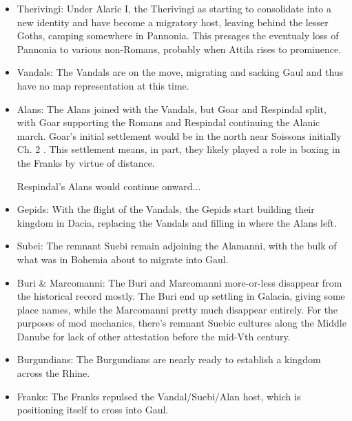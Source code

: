 \documentclass{article}
\newcommand{\specificCite}[1]{\tiny #1 \normalsize}
\begin{document}
\begin{itemize}
		\item Therivingi:\newline
		Under Alaric I, the Therivingi as starting to consolidate into a new identity and have become a migratory host, leaving behind the lesser Goths, camping somewhere in Pannonia.
		This presages the eventualy loss of Pannonia to various non-Romans, probably when Attila rises to prominence.
		
		\item Vandals:\newline
		The Vandals are on the move, migrating and sacking Gaul and thus have no map representation at this time.
		
		\item Alans:\newline
		The Alans joined with the Vandals, but Goar and Respindal split, with Goar supporting the Romans and Respindal continuing the Alanic march.
		Goar's initial settlement would be in the north near Soissons initially \cite{BachrachAlans}\specificCite{Ch. 2}.
		This settlement means, in part, they likely played a role in boxing in the Franks by virtue of distance.
		
		Respindal's Alans would continue onward...
		
		\item Gepids:\newline
		With the flight of the Vandals, the Gepids start building their kingdom in Dacia, replacing the Vandals and filling in where the Alans left.
		
		\item Subei:\newline
		The remnant Suebi remain adjoining the Alamanni, with the bulk of what was in Bohemia about to migrate into Gaul.
		
		\item Buri \& Marcomanni:\newline
		The Buri and Marcomanni more-or-less disappear from the historical record mostly.
		The Buri end up settling in Galacia, giving some place names, while the Marcomanni pretty much disappear entirely.
		For the purposes of mod mechanics, there's remnant Suebic cultures along the Middle Danube for lack of other attestation before the mid-Vth century.
		
		\item Burgundians:\newline
		The Burgundians are nearly ready to establish a kingdom across the Rhine.
		
		\item Franks:\newline
		The Franks repulsed the Vandal/Suebi/Alan host, which is positioning itself to cross into Gaul.
		

\end{itemize}
\end{document}
